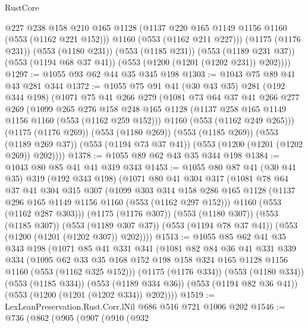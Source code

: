 \begin{lexlean}{RustCore}
\begin{coremodule}
          @227
          @238
          @158
          @210
          @165
          @1128
          (@1137 @220 @165 @1149 @1156 @1160 (@553 (@1162 @221 @152)))
          @1160
          (@553 (@1162 @211 @227)))
        (@1175 (@1176 @231))
        (@553 (@1180 @231))
        (@553 (@1185 @231))
        (@553 (@1189 @231 @37))
        (@553 (@1194 @68 @37 @41))
        (@553 (@1200 (@1201 (@1202 @231)) @202))))
@1297 := @1055 @93 @62 @44 @35 @345 @198
@1303 := @1043 @75 @89 @41 @43 @281 @344
@1372 := @1055
    @75
    @91
    @41
    (@30 @43 @35)
    @281
    (@192 @344 @198)
    (@1071
      @75
      @41
      @266
      @279
      (@1081
        @73
        @64
        @37
        @41
        @266
        @277
        @269
        (@1099
          @265
          @276
          @158
          @248
          @165
          @1128
          (@1137 @258 @165 @1149 @1156 @1160 (@553 (@1162 @259 @152)))
          @1160
          (@553 (@1162 @249 @265)))
        (@1175 (@1176 @269))
        (@553 (@1180 @269))
        (@553 (@1185 @269))
        (@553 (@1189 @269 @37))
        (@553 (@1194 @73 @37 @41))
        (@553 (@1200 (@1201 (@1202 @269)) @202))))
@1378 := @1055 @89 @62 @43 @35 @344 @198
@1384 := @1043 @80 @85 @41 @41 @319 @343
@1453 := @1055
    @80
    @87
    @41
    (@30 @41 @35)
    @319
    (@192 @343 @198)
    (@1071
      @80
      @41
      @304
      @317
      (@1081
        @78
        @64
        @37
        @41
        @304
        @315
        @307
        (@1099
          @303
          @314
          @158
          @286
          @165
          @1128
          (@1137 @296 @165 @1149 @1156 @1160 (@553 (@1162 @297 @152)))
          @1160
          (@553 (@1162 @287 @303)))
        (@1175 (@1176 @307))
        (@553 (@1180 @307))
        (@553 (@1185 @307))
        (@553 (@1189 @307 @37))
        (@553 (@1194 @78 @37 @41))
        (@553 (@1200 (@1201 (@1202 @307)) @202))))
@1513 := @1055
    @85
    @62
    @41
    @35
    @343
    @198
    (@1071
      @85
      @41
      @331
      @341
      (@1081
        @82
        @84
        @36
        @41
        @331
        @339
        @334
        (@1095 @62 @33 @35 @168 @152 @198 @158 @324 @165 @1128 @1156 @1160 (@553 (@1162 @325 @152)))
        (@1175 (@1176 @334))
        (@553 (@1180 @334))
        (@553 (@1185 @334))
        (@553 (@1189 @334 @36))
        (@553 (@1194 @82 @36 @41))
        (@553 (@1200 (@1201 (@1202 @334)) @202))))
@1519 := LexLeanPreservation.Rust.Corr.lNil @686 @516 @721 @1006 @202
@1546 := @736
    (@862
      (@905
        (@907
          (@910
            (@932

\end{coremodule}
\end{lexlean}
